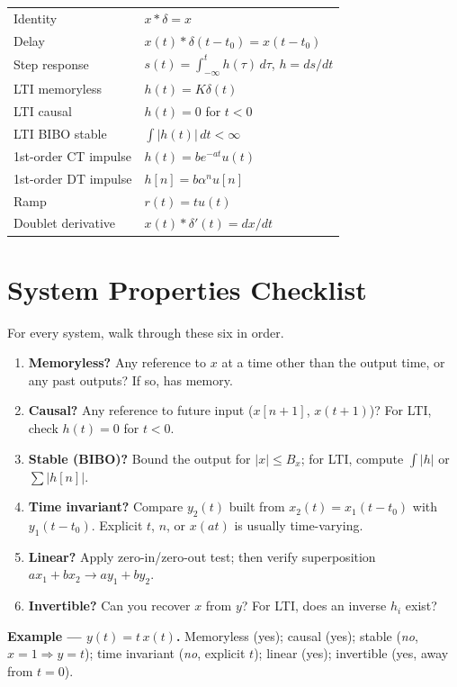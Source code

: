 \documentclass[11pt]{article}
\begin{document}
\begin{center}
\begin{tabular}{|l|l|}
Identity & $x*\delta = x$ \\
Delay & $x(t)*\delta(t-t_0) = x(t-t_0)$ \\
Step response & $s(t) = \int_{-\infty}^{t}h(\tau)\,d\tau$, $h = ds/dt$ \\
LTI memoryless & $h(t) = K\delta(t)$ \\
LTI causal & $h(t) = 0$ for $t<0$ \\
LTI BIBO stable & $\int|h(t)|\,dt < \infty$ \\
1st-order CT impulse & $h(t) = be^{-at}u(t)$ \\
1st-order DT impulse & $h[n] = b\alpha^n u[n]$ \\
Ramp & $r(t) = tu(t)$ \\
Doublet derivative & $x(t)*\delta'(t) = dx/dt$ \\
\hline
\end{tabular}
\end{center}

\section{System Properties Checklist}

For every system, walk through these six in order.
\begin{enumerate}
    \item \textbf{Memoryless?} Any reference to $x$ at a time other than the output time, or any past outputs? If so, has memory.
    \item \textbf{Causal?} Any reference to future input ($x[n+1]$, $x(t+1)$)? For LTI, check $h(t)=0$ for $t<0$.
    \item \textbf{Stable (BIBO)?} Bound the output for $|x|\leq B_x$; for LTI, compute $\int|h|$ or $\sum|h[n]|$.
    \item \textbf{Time invariant?} Compare $y_2(t)$ built from $x_2(t)=x_1(t-t_0)$ with $y_1(t-t_0)$. Explicit $t$, $n$, or $x(at)$ is usually time-varying.
    \item \textbf{Linear?} Apply zero-in/zero-out test; then verify superposition $a x_1 + b x_2 \to a y_1 + b y_2$.
    \item \textbf{Invertible?} Can you recover $x$ from $y$? For LTI, does an inverse $h_i$ exist?
\end{enumerate}

\textbf{Example --- $y(t) = t\,x(t)$.}
Memoryless (yes); causal (yes); stable (\emph{no}, $x=1\Rightarrow y=t$); time invariant (\emph{no}, explicit $t$); linear (yes); invertible (yes, away from $t=0$).
\end{document}
